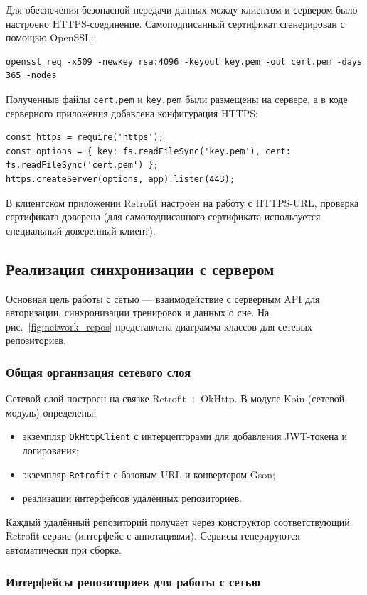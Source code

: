 Для обеспечения безопасной передачи данных между клиентом и сервером было настроено HTTPS-соединение. Самоподписанный сертификат сгенерирован с помощью OpenSSL:
\begin{verbatim}
openssl req -x509 -newkey rsa:4096 -keyout key.pem -out cert.pem -days 365 -nodes
\end{verbatim}
Полученные файлы \texttt{cert.pem} и \texttt{key.pem} были размещены на сервере, а в коде серверного приложения добавлена конфигурация HTTPS:
\begin{verbatim}
const https = require('https');
const options = { key: fs.readFileSync('key.pem'), cert: fs.readFileSync('cert.pem') };
https.createServer(options, app).listen(443);
\end{verbatim}
В клиентском приложении Retrofit настроен на работу с HTTPS-URL, проверка сертификата доверена (для самоподписанного сертификата используется специальный доверенный клиент).

\subsection{Реализация синхронизации с сервером}

Основная цель работы с сетью — взаимодействие с серверным API для авторизации, синхронизации тренировок и данных о сне. На рис.~\ref{fig:network_repos} представлена диаграмма классов для сетевых репозиториев.


\subsubsection{Общая организация сетевого слоя}

Сетевой слой построен на связке Retrofit + OkHttp. В модуле Koin (сетевой модуль) определены:
\begin{itemize}
    \item экземпляр \texttt{OkHttpClient} с интерцепторами для добавления JWT-токена и логирования;
    \item экземпляр \texttt{Retrofit} с базовым URL и конвертером Gson;
    \item реализации интерфейсов удалённых репозиториев.
\end{itemize}

Каждый удалённый репозиторий получает через конструктор соответствующий Retrofit-сервис (интерфейс с аннотациями). Сервисы генерируются автоматически при сборке.


\subsubsection{Интерфейсы репозиториев для работы с сетью}

